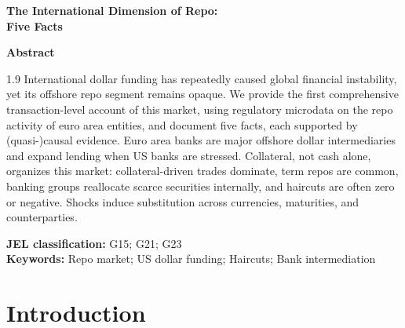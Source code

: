 \documentclass[english, 12pt, oneside]{article}
\begin{document}
\renewcommand{\refname}{References}

\begin{titlepage}
\thispagestyle{empty}
\vspace*{1cm}
\begin{center}
{\LARGE\textbf{The International Dimension of Repo:\\[6pt] Five Facts}}
\end{center}

\vspace{1.5cm}

\centerline{\textbf{Abstract}}
\vspace{0.3cm}

\begin{spacing}{1.9}
\noindent
International dollar funding has repeatedly caused global financial instability, yet its offshore repo segment remains opaque. We provide the first comprehensive transaction-level account of this market, using regulatory microdata on the repo activity of euro area entities, and document five facts, each supported by (quasi-)causal evidence. Euro area banks are major offshore dollar intermediaries and expand lending when US banks are stressed. Collateral, not cash alone, organizes this market: collateral-driven trades dominate, term repos are common, banking groups reallocate scarce securities internally, and haircuts are often zero or negative. Shocks induce substitution across currencies, maturities, and counterparties.

\vspace{0.8cm}
\noindent
\textbf{JEL classification:} G15; G21; G23\\
\textbf{Keywords:} Repo market; US dollar funding; Haircuts; Bank intermediation
\end{spacing}

\end{titlepage}

\setcounter{page}{1}


\clearpage

\section{Introduction}
\end{document}
